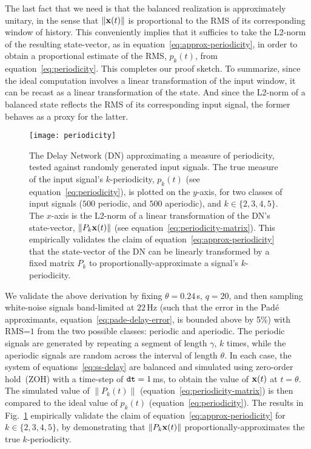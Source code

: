 The last fact that we need is that the balanced realization is approximately unitary, in the sense that $\| \mathbf{x}(t) \|$ is proportional to the RMS of its corresponding window of history.
This conveniently implies that it sufficies to take the L2-norm of the resulting state-vector, as in equation~\ref{eq:approx-periodicity}, in order to obtain a proportional estimate of the RMS, $p_k(t)$, from equation~\ref{eq:periodicity}.
This completes our proof sketch.
To summarize, since the ideal computation involves a linear transformation of the input window, it can be recast as a linear transformation of the state.
And since the L2-norm of a balanced state reflects the RMS of its corresponding input signal, the former behaves as a proxy for the latter.

\begin{figure}
  \centering
  \texttt{[image: periodicity]}
  \caption{\label{fig:periodicity}
    The Delay Network (DN) approximating a measure of periodicity, tested against  randomly generated input signals.
    The true measure of the input signal's $k$-periodicity, $p_k(t)$ (see equation~\ref{eq:periodicity}), is plotted on the $y$-axis, for two classes of input signals ($500$ periodic, and $500$ aperiodic), and $k \in \{2, 3, 4, 5\}$.
    The $x$-axis is the L2-norm of a linear transformation of the DN's state-vector, $\| P_k \mathbf{x}(t) \|$ (see equation~\ref{eq:periodicity-matrix}).
    This empirically validates the claim of equation~\ref{eq:approx-periodicity} that the state-vector of the DN can be linearly transformed by a fixed matrix $P_k$ to proportionally-approximate a signal's $k$-periodicity.
  }
\end{figure}

We validate the above derivation by fixing $\theta=0.24$\,s, $q=20$, and then sampling white-noise signals band-limited at $22$\,Hz (such that the error in the Pad\'e approximants, equation~\ref{eq:pade-delay-error}, is bounded above by 5\%) with RMS=$1$ from the two possible classes: periodic and aperiodic.
The periodic signals are generated by repeating a segment of length $\gamma$, $k$ times, while the aperiodic signals are random across the interval of length $\theta$.
In each case, the system of equations~\ref{eq:ss-delay} are balanced and simulated using zero-order hold~(ZOH) with a time-step of $\texttt{dt}{} = 1$\,ms, to obtain the value of $\mathbf{x}(t)$ at $t = \theta$.
The simulated value of $\| P_k(t) \|$ (equation~\ref{eq:periodicity-matrix}) is then compared to the ideal value of $p_k(t)$ (equation~\ref{eq:periodicity}).
The results in Fig.~\ref{fig:periodicity} empirically validate the claim of equation~\ref{eq:approx-periodicity} for $k \in \{2, 3, 4, 5\}$, by demonstrating that $\|P_k \mathbf{x}(t) \|$ proportionally-approximates the true $k$-periodicity.

